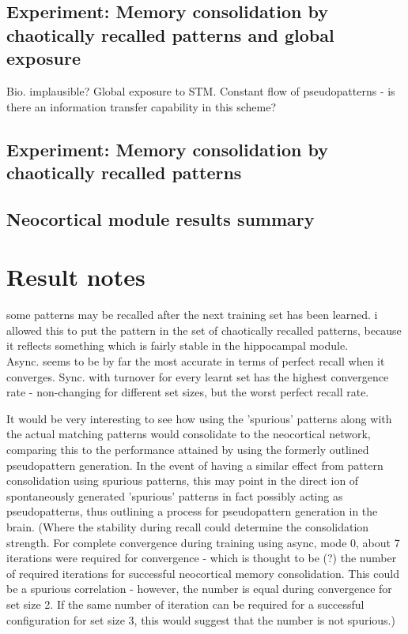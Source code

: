 \subsection{Experiment: Memory consolidation by chaotically recalled patterns and global exposure}

Bio. implausible? Global exposure to STM. Constant flow of pseudopatterns - is there an information transfer capability in this scheme?

\subsection{Experiment: Memory consolidation by chaotically recalled patterns}

\subsection{Neocortical module results summary}


\section*{Result notes}


some patterns may be recalled after the next training set has been learned. i allowed this to put the pattern in the set of chaotically recalled patterns, because it reflects something which is fairly stable in the hippocampal module.
\\

Async. seems to be by far the most accurate in terms of perfect recall when it converges. Sync. with turnover for every learnt set has the highest convergence rate - non-changing for different set sizes, but the worst perfect recall rate.

It would be very interesting to see how using the 'spurious' patterns along with the actual matching patterns would consolidate to the neocortical network, comparing this to the performance attained by using the formerly outlined pseudopattern generation. In the event of having a similar effect from pattern consolidation using spurious patterns, this may point in the direct
ion of spontaneously generated 'spurious' patterns in fact possibly acting as pseudopatterns, thus outlining a process for pseudopattern generation in the brain. (Where the stability during recall could determine the consolidation strength. For complete convergence during training using async, mode 0, about 7 iterations were required for convergence - which is thought to be (?) the number of required iterations for successful neocortical memory consolidation. This could be a spurious correlation - however, the number is equal during convergence for set size 2. If the same number of iteration can be required for a successful configuration for set size 3, this would suggest that the number is not spurious.)
\\

